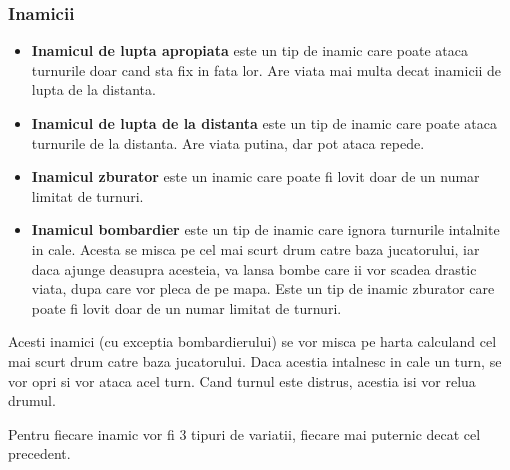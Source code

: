 \documentclass[12pt, a4paper]{article}
\begin{document}
	
	
	
	
	\subsubsection{Inamicii}
	\begin{itemize}
		\item \textbf{Inamicul de lupta apropiata} este un tip de inamic care poate ataca turnurile doar cand sta fix in fata lor. Are viata mai multa decat inamicii de lupta de la distanta.
		\item \textbf{Inamicul de lupta de la distanta} este un tip de inamic care poate ataca turnurile de la distanta. Are viata putina, dar pot ataca repede.
		\item \textbf{Inamicul zburator} este un inamic care poate fi lovit doar de un numar limitat de turnuri.
		\item \textbf{Inamicul bombardier} este un tip de inamic care ignora turnurile intalnite in cale. Acesta se misca pe cel mai scurt drum catre baza jucatorului, iar daca ajunge deasupra acesteia, va lansa bombe care ii vor scadea drastic viata, dupa care vor pleca de pe mapa. Este un tip de inamic zburator care poate fi lovit doar de un numar limitat de turnuri.
	\end{itemize}

	Acesti inamici (cu exceptia bombardierului) se vor misca pe harta calculand cel mai scurt drum catre baza jucatorului. Daca acestia intalnesc in cale un turn, se vor opri si vor ataca acel turn. Cand turnul este distrus, acestia isi vor relua drumul.
	\newline
	
	Pentru fiecare inamic vor fi 3 tipuri de variatii, fiecare mai puternic decat cel precedent.
	
	
	
	
	
\end{document}
